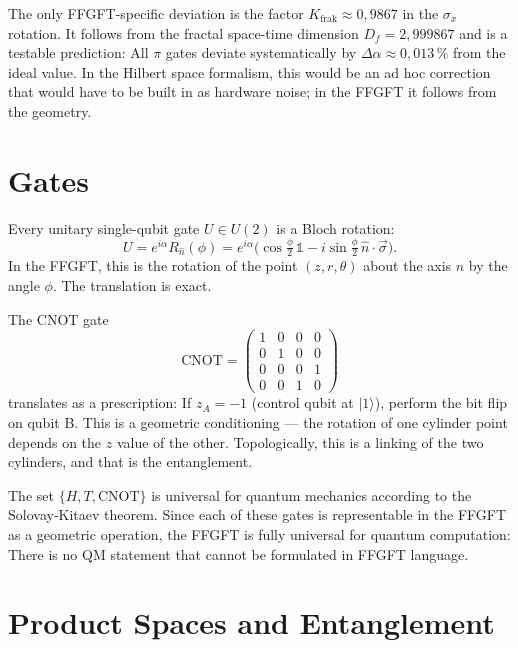 The only FFGFT-specific deviation is the factor
$K_{\mathrm{frak}}\approx0{,}9867$ in the $\sigma_x$ rotation. It follows from
the fractal space-time dimension $D_f = 2{,}999867$ and is a testable
prediction: All $\pi$ gates deviate systematically by
$\Delta\alpha\approx0{,}013\,\%$ from the ideal value. In the
Hilbert space formalism, this would be an ad hoc correction that would have to be built in as hardware noise; in the FFGFT it follows from
the geometry.

\section{Gates}

Every unitary single-qubit gate $U\in U(2)$ is a Bloch rotation:
\begin{equation}
  U = e^{i\alpha}R_{\hat n}(\phi)
    = e^{i\alpha}\bigl(\cos\tfrac{\phi}{2}\,\mathbb{1}
      - i\sin\tfrac{\phi}{2}\,\hat n\cdot\vec\sigma\bigr).
\end{equation}
In the FFGFT, this is the rotation of the point $(z,r,\theta)$ about the axis
$\hat n$ by the angle $\phi$. The translation is exact.

The CNOT gate
\begin{equation}
  \mathrm{CNOT} =
  \begin{pmatrix}1&0&0&0\\0&1&0&0\\0&0&0&1\\0&0&1&0\end{pmatrix}
\end{equation}
translates as a prescription: If $z_A = -1$ (control qubit at
$|1\rangle$), perform the bit flip on qubit B. This is a geometric
conditioning --- the rotation of one cylinder point depends on the
$z$ value of the other. Topologically, this is a linking of the two
cylinders, and that is the entanglement.

The set $\{H,T,\mathrm{CNOT}\}$ is universal for quantum mechanics according to the Solovay-Kitaev theorem. Since each of these gates is
representable in the FFGFT as a geometric operation, the FFGFT is
fully universal for quantum computation: There is no QM statement
that cannot be formulated in FFGFT language.

\section{Product Spaces and Entanglement}


